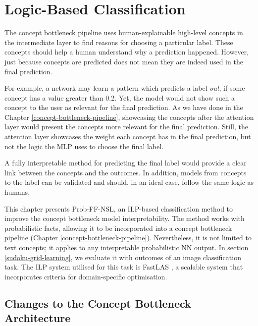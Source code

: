 \chapter{Logic-Based Classification}
\label{logic-based-classification}

The concept bottleneck pipeline \cite{RefWorks:RefID:35-koh2020concept} uses human-explainable high-level concepts in the intermediate layer to find reasons for choosing a particular label.
These concepts should help a human understand why a prediction happened.
However, just because concepts are predicted does not mean they are indeed used in the final prediction.

For example, a network may learn a pattern which predicts a label \emph{out}, if some concept has a value greater than 0.2.
Yet, the model would not show such a concept to the user as relevant for the final prediction.
As we have done in the Chapter \ref{concept-bottleneck-pipeline}, showcasing the concepts after the attention layer would present the concepts more relevant for the final prediction.
Still, the attention layer showcases the weight each concept has in the final prediction, but not the logic the MLP uses to choose the final label.

A fully interpretable method for predicting the final label would provide a clear link between the concepts and the outcomes.
In addition, models from concepts to the label can be validated and should, in an ideal case, follow the same logic as humans.

This chapter presents Prob-FF-NSL, an ILP-based classification method to improve the concept bottleneck model interpretability. 
The method works with probabilistic facts, allowing it to be incorporated into a concept bottleneck pipeline (Chapter \ref{concept-bottleneck-pipeline}).
Nevertheless, it is not limited to text concepts; it applies to any interpretable probabilistic NN output. 
In section \ref{sudoku-grid-learning}, we evaluate it with outcomes of an image classification task.
The ILP system utilised for this task is FastLAS \cite{RefWorks:RefID:19-law2020fastlas:}, a scalable system that incorporates criteria for domain-specific optimisation.

\section{Changes to the Concept Bottleneck Architecture}
\label{change-to-the-concept-bottleneck-architecture}

